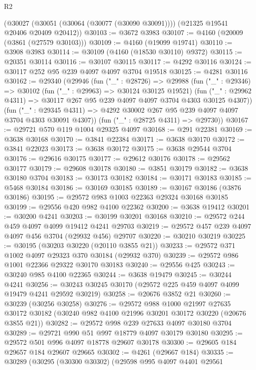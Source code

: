 \begin{lexlean}{R2}
\begin{coremodule}
    (@30027 (@30051 (@30064 (@30077 (@30090 @30091)))) (@21325 @19541 @20406 @20409 @20412))
@30103 := @3672 @3983
@30107 := @4160 (@20009 (@3861 (@27579 @30103)))
@30109 := @4160 (@19099 @19741)
@30110 := @3908 @3983
@30114 := @30109 (@4160 (@18530 @30110) @9372)
@30115 := @20351 @30114
@30116 := @30107 @30115
@30117 := @4292 @30116
@30124 := @30117 @252 @95 @239 @4097 @4097 @3704 @19518
@30125 := @4281 @30116
@30162 := @29340
    (@29946
      (fun ("_" : @28726) =>
      @29988
        (fun ("_" : @29346) =>
        @30102
          (fun ("_" : @29963) => @30124 @30125 @19521)
          (fun ("_" : @29962 @4311) => @30117 @267 @95 @239 @4097 @4097 @3704 @4303 @30125 @4307))
        (fun ("_" : @29345 @4311) =>
        @4292 @30002 @267 @95 @239 @4097 @4097 @3704 @4303 @30091 @4307))
      (fun ("_" : @28725 @4311) => @29730))
@30167 := @29721 @570 @119 @1004 @29325 @4097
@30168 := @291 @22381
@30169 := @3638 @30168
@30170 := @3841 @22384
@30171 := @3638 @30170
@30172 := @3841 @22023
@30173 := @3638 @30172
@30175 := @3638 @29544 @3704
@30176 := @29616 @30175
@30177 := @29612 @30176
@30178 := @29562 @30177
@30179 := @29608 @30178
@30180 := @3851 @30179
@30182 := @3638 @30180 @3704
@30183 := @30173 @30182
@30184 := @30171 @30183
@30185 := @5468 @30184
@30186 := @30169 @30185
@30189 := @30167 @30186 (@3876 @30186)
@30195 := @29572 @983 @1003 @22363 @29324 @30168 @30185
@30199 := @29556 @420 @982 @4100 @22362
@30200 := @3638 @19412
@30201 := @30200 @4241
@30203 := @30199 @30201 @30168
@30210 := @29572 @244 @459 @4097 @4099 @19412 @4241 @29703
@30219 := @29572 @457 @239 @4097 @4097 @456 @3704 (@29932 @456) @29707
@30220 := @30210 @30219
@30225 := @30195 (@30203 @30220 (@20110 @3855 @21))
@30233 := @29572 @371 @1002 @4097 @29323 @370 @30184 (@29932 @370)
@30239 := @29572 @986 @1001 @22366 @29322 @30170 @30183
@30240 := @29556 @425
@30243 := @30240 @985 @4100 @22365
@30244 := @3638 @19479
@30245 := @30244 @4241
@30256 := @30243 @30245 @30170 (@29572 @225 @459 @4097 @4099 @19479 @4241 @29592 @30219)
@30258 := @20676 @3852 @21
@30260 := @30239 (@30256 @30258)
@30276 := @29572
    @988
    @1000
    @21997
    @27635
    @30172
    @30182
    (@30240 @982 @4100 @21996 @30201 @30172 @30220 (@20676 @3855 @21))
@30282 := @29572 @998 @239 @27633 @4097 @30180 @3704
@30289 := @29721 @990 @51 @997 @18779 @4097 @30179 @30180
@30295 := @29572 @501 @996 @4097 @18778 @29607 @30178
@30300 := @29605 @184 @29657 @184 @29607 @29665
@30302 := @4261 (@29667 @184)
@30335 := @30289
    (@30295
      (@30300 @30302)
      (@29598
        @995
        @4097
        @4401
        @29561

\end{coremodule}
\end{lexlean}
